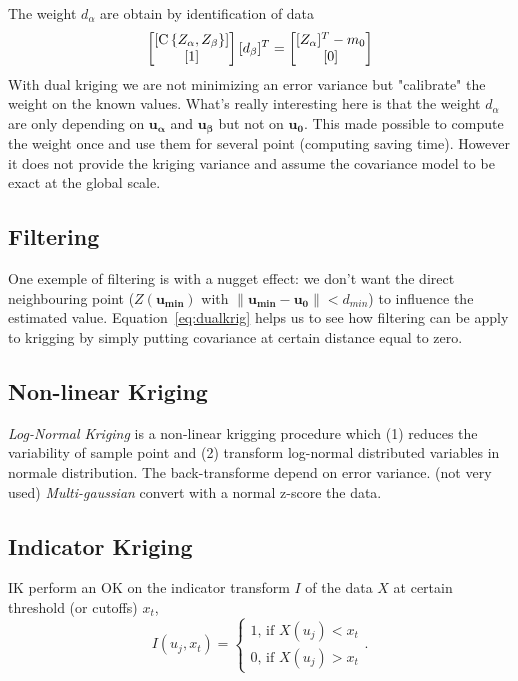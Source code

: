 \documentclass[twocolumn]{article}
\numberwithin{equation}{section}
\begin{document}
The weight $d_\alpha$ are obtain by identification of data
\begin{equation}
		\begin{bmatrix}
       		[\operatorname{C}\left\{Z_\alpha,Z_\beta\right\}]		\\
       		[1]													\\
     	\end{bmatrix} 
       	[d_\beta]^T 	\\
     	=
     	\begin{bmatrix}
       		[Z_\alpha]^T - m_0 	\\
       		[0] 					\\
     	\end{bmatrix}
\end{equation}
With dual kriging we are not minimizing an error variance but "calibrate" the weight on the known values. What's really interesting here is that the weight $d_\alpha$ are only depending on $\boldsymbol{u_\alpha}$ and $\boldsymbol{u_\beta}$ but not on $\boldsymbol{u_0}$. This made possible to compute the weight once and use them for several point (computing saving time). However it does not provide the kriging variance and assume the covariance model to be exact at the global scale. 

\subsection{Filtering}
One exemple of filtering is with a nugget effect: we don't want the direct neighbouring point ($Z(\boldsymbol{u_{min}})$ with $\| \boldsymbol{u_{min}}-\boldsymbol{u_0}\|< d_{min}$) to influence the estimated value. Equation~\ref{eq:dualkrig} helps us to see how filtering can be apply to krigging by simply putting covariance at certain distance equal to zero. 


\subsection{Non-linear Kriging}
 \emph{Log-Normal Kriging} is a non-linear krigging procedure which (1) reduces the variability of sample point and (2) transform log-normal distributed variables in normale distribution. The back-transforme depend on error variance. (not very used)
\emph{Multi-gaussian} convert with a normal z-score the data. 

\subsection{Indicator Kriging}
IK perform an OK on the indicator transform $I$ of the data $X$ at certain threshold (or cutoffs) $x_t$,
\[I(u_j,x_t) = \left\{
	\begin{array}{l}
		1 \text{, if }X(u_j)<x_t\\
		0 \text{, if }X(u_j)>x_t
	\end{array}.
\right.\]
\end{document}
